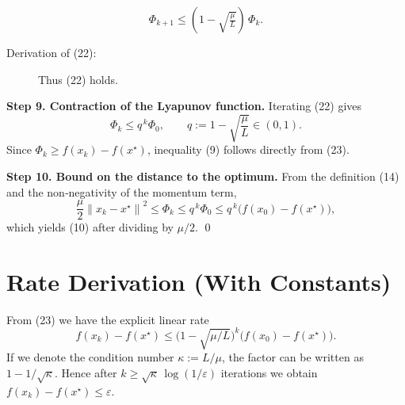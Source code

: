 \documentclass{article}
\newcommand{\norm}[1]{\left\|#1\right\|}
\newcommand{\ip}[2]{\langle #1,#2\rangle}
\begin{document}
\[
\Phi_{k+1}\le (1-\sqrt{\tfrac{\mu}{L}})\,\Phi_{k}. \tag{22}
\]
\begin{description}
\item[Derivation of (22):]  
Thus (22) holds. \qedhere
\end{description}
\noindent\textbf{Step 9. Contraction of the Lyapunov function.}  
Iterating (22) gives
\[
\Phi_{k}\le q^{\,k}\Phi_{0},\qquad q:=1-\sqrt{\frac{\mu}{L}}\in(0,1). \tag{23}
\]
Since $\Phi_{k}\ge f(x_{k})-f(x^{\star})$, inequality (9) follows directly from (23).  

\noindent\textbf{Step 10. Bound on the distance to the optimum.}  
From the definition (14) and the non‑negativity of the momentum term,
\[
\frac{\mu}{2}\norm{x_{k}-x^{\star}}^{2}\le\Phi_{k}\le q^{\,k}\Phi_{0}
\le q^{\,k}\bigl(f(x_{0})-f(x^{\star})\bigr), \tag{24}
\]
which yields (10) after dividing by $\mu/2$.
\qed

\section*{Rate Derivation (With Constants)}
From (23) we have the explicit linear rate
\[
f(x_{k})-f(x^{\star})\le
\bigl(1-\sqrt{\mu/L}\bigr)^{k}
\bigl(f(x_{0})-f(x^{\star})\bigr).
\]
If we denote the condition number $\kappa:=L/\mu$, the factor can be written as $1-1/\sqrt{\kappa}$.  Hence after $k\ge\sqrt{\kappa}\,\log(1/\varepsilon)$ iterations we obtain $f(x_{k})-f(x^{\star})\le\varepsilon$.
\end{document}
